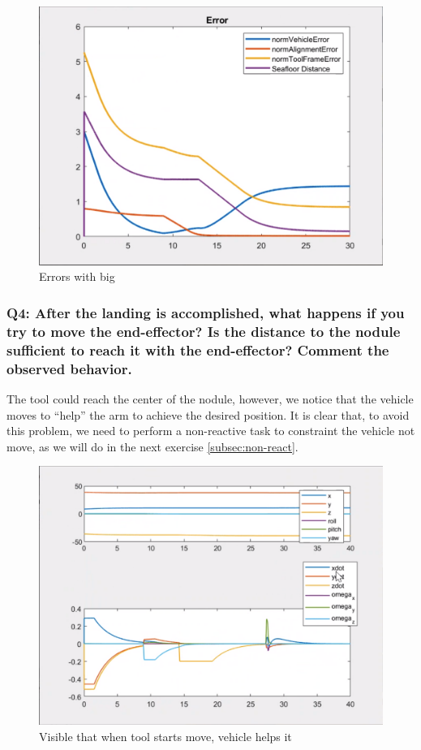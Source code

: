 \documentclass{article}
\begin{document}
\begin{figure}[htpb]
\begin{minipage}{0.40\textwidth}
\includegraphics[width=\textwidth]{313_b_Errors.png}
\caption{Errors with big}\label{err_w_b} 
\end{minipage}
\end{figure}

\clearpage 
\subsubsection{Q4: After the landing is accomplished, what happens if you try to move the end-effector? Is the distance to the nodule sufficient to reach it with the end-effector? Comment the observed behavior.}\label{ex3}
The tool could reach the center of the nodule, however, we notice that the vehicle moves to ``help'' the arm to achieve the desired position. It is clear that, to avoid this problem, we need to perform a non-reactive task to constraint the vehicle not move, as we will do in the next exercise \ref{subsec:non-react}. 

\begin{figure}[h]
    \centering
    \includegraphics[scale=0.4]{314_ppdot.png}
    \caption{Visible that when tool starts move, vehicle helps it}
    \label{graphes3}
\end{figure}
\end{document}

